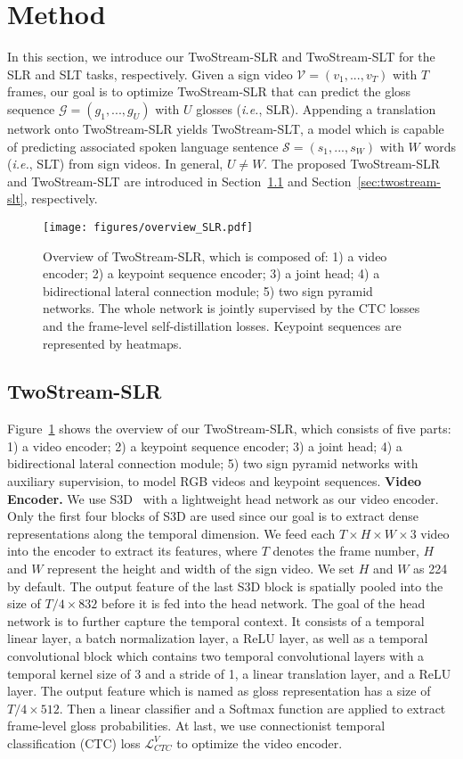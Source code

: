 \documentclass{article}
\def\ie{\emph{i.e.}} \def\Ie{\emph{I.e.}}
\begin{document}
 \section{Method}
In this section, we introduce our TwoStream-SLR and TwoStream-SLT for the SLR and SLT tasks, respectively. Given a sign video $\mathcal{V}=(v_1,...,v_T)$ with $T$ frames, our goal is to optimize TwoStream-SLR that can predict the gloss sequence $\mathcal{G}=(g_1,...,g_U)$ with $U$ glosses (\ie, SLR). Appending a translation network onto TwoStream-SLR yields TwoStream-SLT, a model which is capable of predicting associated spoken language sentence $\mathcal{S}=(s_1,...,s_W)$ with $W$ words (\ie, SLT) from sign videos. In general, $U \neq W$. The proposed TwoStream-SLR and TwoStream-SLT are introduced in Section~\ref{sec:twostream-slr} and Section~\ref{sec:twostream-slt}, respectively.



\begin{figure}[t]
\centering
\texttt{[image: figures/overview\_SLR.pdf]}
\caption{Overview of TwoStream-SLR, which is composed of: 1) a video encoder; 2) a keypoint sequence encoder; 3) a joint head; 4) a bidirectional lateral connection module; 5) two sign pyramid networks. The whole network is jointly supervised by the CTC losses and the frame-level self-distillation losses. Keypoint sequences are represented by heatmaps.}
\label{fig:overview_SLR}
\end{figure}

\subsection{TwoStream-SLR}
\label{sec:twostream-slr}
Figure~\ref{fig:overview_SLR} shows the overview of our TwoStream-SLR, which consists of five parts: 1) a video encoder; 2) a keypoint sequence encoder; 3) a joint head; 4) a bidirectional lateral connection module; 5) two sign pyramid networks with auxiliary supervision, to model RGB videos and keypoint sequences. 
\textbf{Video Encoder.} We use S3D~\cite{xie2018rethinking} with a lightweight head network as our video encoder. Only the first four blocks of S3D are used since our goal is to extract dense representations along the temporal dimension. We feed each $T\times H \times W \times 3$ video into the encoder to extract its features, where $T$ denotes the frame number, $H$ and $W$ represent the height and width of the sign video. We set $H$ and $W$ as 224 by default. The output feature of the last S3D block is spatially pooled into the size of $T/4 \times 832$ before it is fed into the head network. The goal of the head network is to further capture the temporal context. It consists of a temporal linear layer, a batch normalization layer, a ReLU layer, as well as a temporal convolutional block which contains two temporal convolutional layers with a temporal kernel size of 3 and a stride of 1, a linear translation layer, and a ReLU layer. The output feature which is named as gloss representation has a size of $T/4 \times 512$. Then a linear classifier and a Softmax function are applied to extract frame-level gloss probabilities. At last, we use connectionist temporal classification (CTC) loss $\mathcal{L}^{V}_{CTC}$ to optimize the video encoder.
\end{document}
